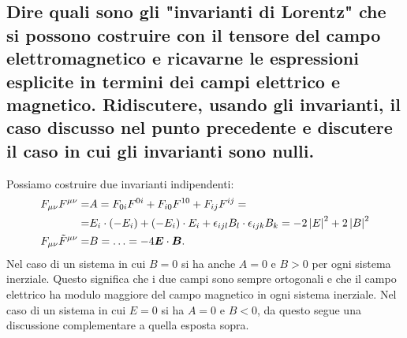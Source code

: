 \subsection[]{Dire quali sono gli "invarianti di Lorentz" che si possono costruire con il tensore del campo elettromagnetico e ricavarne le espressioni esplicite in termini dei campi elettrico e magnetico. Ridiscutere, usando gli invarianti, il caso discusso nel punto precedente e discutere il caso in cui gli invarianti sono nulli.}
\label{sec:3.b.5}
Possiamo costruire due invarianti indipendenti:
\begin{align*}
	F_{\mu\nu}F^{\mu\nu}=&A=F_{0i}F^{0i}+F_{i 0}F^{1 0} + F_{ij}F^{ij}=\\ 
	=& E_{i}\cdot \left( -E_{i} \right)+\left( -E_{i}\right)\cdot E_{i} + \epsilon_{ijl}B_{l}\cdot \epsilon_{ijk}B_{k}=-2\left| E \right|^2 + 2\left|B\right|^2\\
	F_{\mu\nu}\tilde{F}^{\mu\nu}=&B=\ldots=-4 \boldsymbol{E}\cdot \boldsymbol{B}
.\end{align*}
Nel caso di un sistema in cui $B=0$ si ha anche $A=0$ e $B>0$ per ogni sistema inerziale. Questo significa che i due campi sono sempre ortogonali e che il campo elettrico ha modulo maggiore del campo magnetico in ogni sistema inerziale.
Nel caso di un sistema in cui $E=0$ si ha $A=0$ e $B<0$, da questo segue una discussione complementare a quella esposta sopra.

